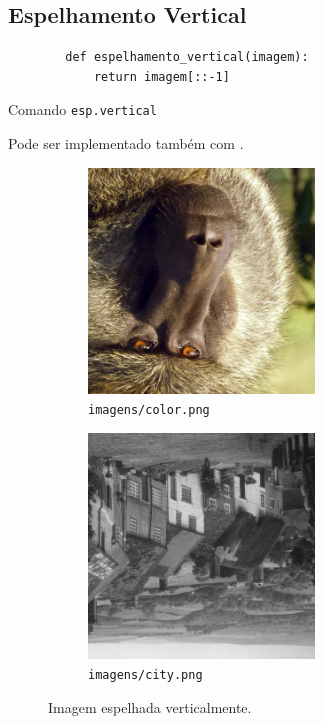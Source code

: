 \subsection{Espelhamento Vertical}

\begin{listing}[H]
    \begin{verbatim}
        def espelhamento_vertical(imagem):
            return imagem[::-1]
    \end{verbatim}

    \caption{Comando \texttt{esp.vertical}}
\end{listing}

Pode ser implementado também com  \autocite{ref:flip}.

\begin{figure}[H]
    \centering
    \begin{subfigure}{0.45\textwidth}
        \centering
        \includegraphics[width=6cm]{resultados/colorflip.png}
        \caption{\texttt{imagens/color.png}}
    \end{subfigure}%
    \begin{subfigure}{0.45\textwidth}
        \centering
        \includegraphics[width=6cm]{resultados/cityflip.png}
        \caption{\texttt{imagens/city.png}}
    \end{subfigure}

    \caption{Imagem espelhada verticalmente.}
\end{figure}
